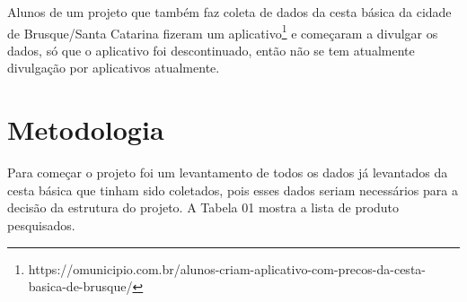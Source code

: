 \documentclass{ifto-tex}
\begin{document}
Alunos de um projeto que também faz coleta de dados da cesta básica da cidade de Brusque/Santa Catarina fizeram um aplicativo\footnote{https://omunicipio.com.br/alunos-criam-aplicativo-com-precos-da-cesta-basica-de-brusque/} e começaram a divulgar os dados, só que o aplicativo foi descontinuado, então não se tem atualmente divulgação por aplicativos atualmente.	
\chapter{Metodologia}
	
	
Para começar o projeto foi um levantamento de todos os dados já levantados da cesta básica que tinham sido coletados, pois esses dados seriam necessários para a decisão da estrutura do projeto. A Tabela 01 mostra a lista de produto pesquisados.
\end{document}
